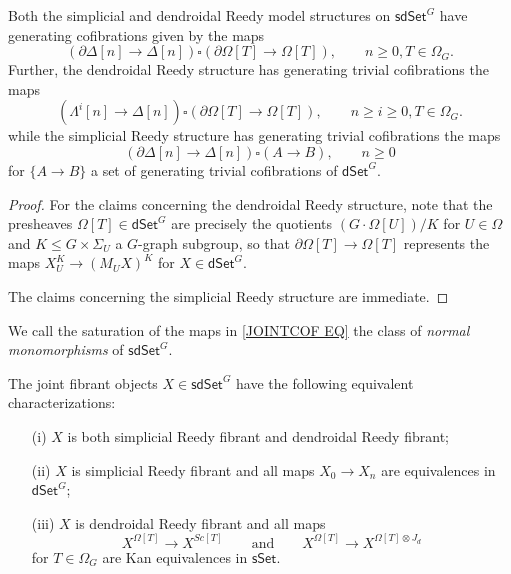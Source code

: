 \documentclass[a4paper,10pt,draft]{article}%
\begin{document}
\begin{proposition}
	Both the simplicial and dendroidal Reedy model structures on 
	$\mathsf{sdSet}^G$ have generating cofibrations given by the maps
\begin{equation}\label{JOINTCOF EQ}
	\left(\partial \Delta [n] \to \Delta[n]\right)
		\square
	\left(\partial \Omega[T] \to \Omega[T]\right),
	\qquad
	n\geq 0, T \in \Omega_G.
\end{equation}
  Further, the dendroidal Reedy structure has generating trivial cofibrations the maps
\begin{equation}\label{DENDTRIVCOF EQ}
	\left(\Lambda^i [n] \to \Delta[n]\right)
		\square
	\left(\partial \Omega[T] \to \Omega[T]\right),
	\qquad
	n\geq i \geq 0, T \in \Omega_G.
\end{equation}
while the simplicial Reedy structure has generating trivial cofibrations the maps
\begin{equation}\label{SIMPTRIVCOF EQ}
	\left(\partial \Delta [n] \to \Delta[n]\right)
		\square
	\left(A \to B\right),
	\qquad
	n\geq 0
\end{equation}
for $\{A \to B\}$ a set of generating trivial cofibrations of
$\mathsf{dSet}^G$.
\end{proposition}

\begin{proof}
	For the claims concerning the dendroidal Reedy structure, 
	note that the presheaves $\Omega[T] \in \mathsf{dSet}^G$
	are precisely the quotients $(G \cdot \Omega[U])/K$ for $U\in \Omega$ and $K \leq G \times \Sigma_U$ a $G$-graph subgroup,
	so that $\partial \Omega[T] \to \Omega[T]$
	represents the maps $X_U^K \to (M_U X)^K$ for $X \in \mathsf{dSet}^G$.
	
	The claims concerning the simplicial Reedy structure are immediate.
\end{proof}

We call the saturation of the maps in \eqref{JOINTCOF EQ} the class of \textit{normal monomorphisms} of $\mathsf{sdSet}^G$.

\begin{corollary}\label{JOINTFIBCHAR COR}
The joint fibrant objects $X \in \mathsf{sdSet}^G$ have the following equivalent characterizations:
\begin{itemize}
	\item[(i)] $X$ is both simplicial Reedy fibrant and dendroidal Reedy fibrant;
	\item[(ii)] $X$ is simplicial Reedy fibrant and all maps 
	$X_0 \to X_n$ are equivalences in $\mathsf{dSet}^{G}$;
	\item[(iii)] $X$ is dendroidal Reedy fibrant and all maps
\[
	X^{\Omega[T]} \to X^{Sc[T]}
\qquad \text{and} \qquad
	X^{\Omega[T]} \to X^{\Omega[T]\otimes J_d}
\]
for $T \in \Omega_G$ are Kan equivalences in $\mathsf{sSet}$.
\end{itemize}
\end{corollary}
\end{document}
